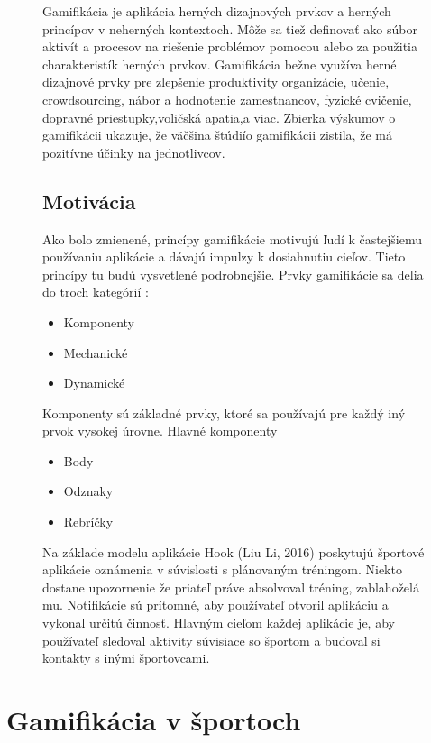 \documentclass[10pt,twoside,slovak,a4paper]{article}
\begin{document}
\begin{figure}[tbh]
Gamifikácia je aplikácia herných dizajnových prvkov a herných princípov v neherných kontextoch. Môže sa tiež definovať ako súbor aktivít a procesov na riešenie problémov pomocou alebo za použitia charakteristík herných prvkov. Gamifikácia bežne využíva herné dizajnové
prvky pre zlepšenie produktivity organizácie, učenie, crowdsourcing, nábor a hodnotenie zamestnancov, fyzické cvičenie, dopravné priestupky,voličská apatia,a viac. Zbierka výskumov o gamifikácii ukazuje, že väčšina štúdiío gamifikácii zistila, že má pozitívne účinky na jednotlivcov.


\subsection{Motivácia} 

Ako bolo zmienené, princípy gamifikácie motivujú ľudí k častejšiemu používaniu aplikácie a dávajú impulzy k dosiahnutiu cieľov. Tieto princípy tu budú vysvetlené podrobnejšie. 
\label{prvky} Prvky gamifikácie sa delia do troch kategórií :
\begin{itemize}
  \item {Komponenty}
  \item {Mechanické}
  \item {Dynamické}
\end{itemize}
Komponenty sú základné prvky, ktoré sa používajú pre každý iný prvok vysokej úrovne. Hlavné komponenty
\begin{itemize}
  \item {Body}
  \item {Odznaky}
  \item {Rebríčky}
\end{itemize}
\end{figure}
\begin{figure}
    
Na základe modelu aplikácie Hook (Liu Li, 2016) \cite{Improving_motivation-Framework} poskytujú športové aplikácie oznámenia v súvislosti s plánovaným tréningom. Niekto dostane upozornenie že priateľ práve absolvoval tréning, zablahoželá mu. Notifikácie sú prítomné, aby používateľ otvoril aplikáciu a vykonal určitú činnosť. Hlavným cieľom každej aplikácie je, aby používateľ sledoval aktivity súvisiace so športom a budoval si kontakty s inými športovcami.
\end{figure}
\section{Gamifikácia v športoch} \label{gamifikacia v športoch}
\end{document}
